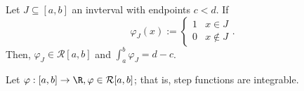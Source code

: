 \begin{lemma}[BS-7.2.4]
    Let $J \subseteq [a, b]$ an invterval with endpoints $c < d$. If $$\varphi_J(x) := \begin{cases}
        1 & x \in J\\
        0 & x \notin J
    \end{cases}.$$ Then, $\varphi_J \in \mathcal{R}[a, b]$ and $\int_a^b \varphi_J = d- c$.
\end{lemma}

\begin{theorem}
    Let $\varphi : [a, b] \to \R, \varphi \in \mathcal{R}[a,b]$; that is, step functions are integrable.
\end{theorem}